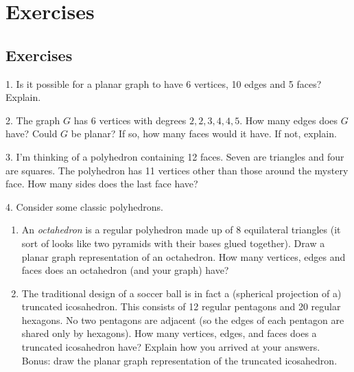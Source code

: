 \documentclass[10pt,]{book}
\theoremstyle{plain}
\theoremstyle{definition}
\numberwithin{equation}{chapter}
\begin{document}
\section[Exercises]{Exercises}\label{section-22}
\typeout{************************************************}
\typeout{************************************************}
\subsection[Exercises]{Exercises}\label{exercises_gt-planar}
\begin{exerciselist}
\item[1.]\hypertarget{exercise-282}{}
Is it possible for a planar graph to have 6 vertices, 10 edges and 5 faces? Explain.
%
\par\smallskip
\item[2.]\hypertarget{exercise-283}{}
The graph \(G\) has 6 vertices with degrees \(2, 2, 3, 4, 4, 5\). How many edges does \(G\) have? Could \(G\) be planar? If so, how many faces would it have.  If not, explain.
%
\par\smallskip
\item[3.]\hypertarget{exercise-284}{}
I'm thinking of a polyhedron containing 12 faces. Seven are triangles and four are squares. The polyhedron has 11 vertices other than those around the mystery face. How many sides does the last face have?
%
\par\smallskip
\item[4.]\hypertarget{exercise-285}{}
      Consider some classic polyhedrons.
    \leavevmode%
\begin{enumerate}[label=(\alph*)]
\item\hypertarget{li-778}{}
          An \emph{octahedron} is a regular polyhedron made up of 8 equilateral triangles (it sort of looks like two pyramids with their bases glued together). Draw a planar graph representation of an octahedron. How many vertices, edges and faces does an octahedron (and your graph) have?


\item\hypertarget{li-779}{}
          The traditional design of a soccer ball is in fact a (spherical projection of a) truncated icosahedron. This consists of 12 regular pentagons and 20 regular hexagons. No two pentagons are adjacent (so the edges of each pentagon are shared only by hexagons). How many vertices, edges, and faces does a truncated icosahedron have? Explain how you arrived at your answers. Bonus: draw the planar graph representation of the truncated icosahedron.



\end{enumerate}
\end{exerciselist}
\end{document}
